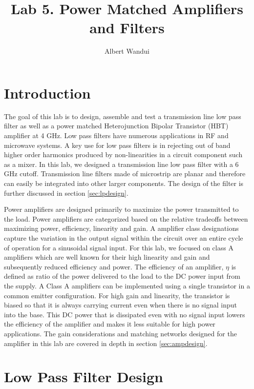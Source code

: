 \documentclass[twocolumn, aps, floatfix]{revtex4-1}
\begin{document}
\title{Lab 5. Power Matched Amplifiers and Filters }
\author{Albert Wandui}
\maketitle

\section*{Introduction}\label{sec:introduction}
The goal of this lab is to design, assemble and test a transmission line low pass filter as well as a power matched Heterojunction Bipolar Transistor (HBT) amplifier at 4 GHz. Low pass filters have numerous applications in RF and microwave systems. A key use for low pass filters is in rejecting out of band higher order harmonics produced by non-linearities in a circuit component such as a mixer. In this lab, we designed a transmission line low pass filter with a 6 GHz cutoff. Transmission line filters made of microstrip are planar and therefore can easily be integrated into other larger components. The design of the filter is further discussed in section \ref{sec:lpdesign}.

Power amplifiers are designed primarily to maximize the power transmitted to the load. Power amplifiers are categorized based on the relative tradeoffs between maximizing power, efficiency, linearity and gain. A amplifier class designations capture the variation in the output signal within the circuit over an entire cycle of operation for a sinusoidal signal input. For this lab, we focused on class A amplifiers which are well known for their high linearity and gain and subsequently reduced efficiency and power. The efficiency of an amplifier, $\eta$ is defined as ratio of the power delivered to the load to the DC power input from the supply. A Class A amplifiers can be implemented using a single transistor in a common emitter configuration. For high gain and linearity, the transistor is biased so that it is always carrying current even when there is no signal input into the base. This DC power that is dissipated even with no signal input lowers the efficiency of the amplifier and makes it less suitable for high power applications. The gain considerations and matching networks designed for the amplifier in this lab are covered in depth in section \ref{sec:ampdesign}. 

\section*{Low Pass Filter Design}\label{sec:lpdesign}
\end{document}
